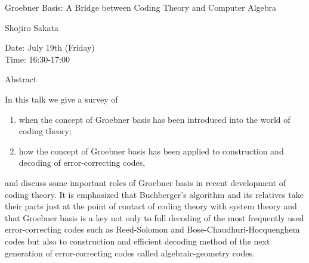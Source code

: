 \begin{center}
\LARGE
Groebner Basis: A Bridge between Coding Theory and Computer Algebra
\end{center}

\begin{center}
\Large
Shojiro Sakata
\end{center}

\noindent
Date:  July 19th (Friday)\\
Time:  16:30-17:00 \\

\begin{center}
\large
Abstract
\end{center}

In this talk we give a survey of 
\begin{enumerate}
\item
when the concept of Groebner basis has been introduced into the world of coding theory; 
\item
how the concept of Groebner basis has been applied to construction and decoding of
    error-correcting codes,
\end{enumerate}
and discuss some important roles of Groebner basis in recent development of coding theory. It is
emphasized that Buchberger's algorithm and its relatives take their parts just at the point of contact
of coding theory with system theory and that Groebner basis is a key not only to full decoding of
the most frequently used error-correcting codes such as Reed-Solomon and
Bose-Chaudhuri-Hocquenghem codes but also to construction and efficient decoding method of
the next generation of error-correcting codes called algebraic-geometry codes. 


